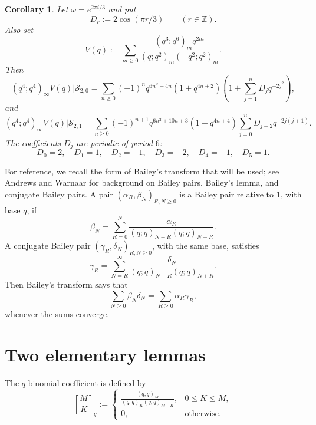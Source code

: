 \documentclass[11pt]{amsart}
\newtheorem{corollary}[theorem]{Corollary}
\theoremstyle{remark}
\newcommand{\Z}{\mathbb Z}
\newcommand{\qbinom}[3][]{\genfrac{[}{]}{0pt}{}{#2}{#3}_{#1}}
\newcommand{\sieve}[2]{\mathcal S_{#1,#2}}
\begin{document}
\begin{corollary}\label{cor:omega}
Let $\omega=e^{2\pi i/3}$ and put
\[
D_r:=2\cos(\pi r/3)\qquad(r\in\Z).
\]
Also set
\[
V(q):=\sum_{m\ge0}
\frac{(q^3;q^6)_m q^{2m}}
{(q;q^2)_m(-q^2;q^2)_m}.
\]
Then
\begin{equation}\label{omega-even}
(q^4;q^4)_\infty V(q)\big|\sieve{2}{0}
=
\sum_{n\ge0}(-1)^nq^{6n^2+4n}(1+q^{4n+2})
\left(1+\sum_{j=1}^{n}D_jq^{-2j^2}\right),
\end{equation}
and
\begin{equation}\label{omega-odd}
(q^4;q^4)_\infty V(q)\big|\sieve{2}{1}
=
\sum_{n\ge0}(-1)^{n+1}q^{6n^2+10n+3}(1+q^{4n+4})
\sum_{j=0}^{n}D_{j+2}q^{-2j(j+1)}.
\end{equation}
The coefficients $D_j$ are periodic of period $6$:
\[
D_0=2,\quad D_1=1,\quad D_2=-1,\quad D_3=-2,\quad
D_4=-1,\quad D_5=1.
\]
\end{corollary}

For reference, we recall the form of Bailey's transform that will be used; see Andrews \cite[Chapter 3]{AndrewsQSeries} and Warnaar \cite{WarnaarBailey} for background on Bailey pairs, Bailey's lemma, and conjugate Bailey pairs.  A pair $(\alpha_R,\beta_N)_{R,N\ge0}$ is a Bailey pair relative to $1$, with base $q$, if
\begin{equation}\label{bailey-pair-def}
\beta_N=
\sum_{R=0}^{N}\frac{\alpha_R}{(q;q)_{N-R}(q;q)_{N+R}}.
\end{equation}
A conjugate Bailey pair $(\gamma_R,\delta_N)_{R,N\ge0}$, with the same base, satisfies
\begin{equation}\label{conjugate-bailey-def}
\gamma_R=
\sum_{N=R}^{\infty}\frac{\delta_N}{(q;q)_{N-R}(q;q)_{N+R}}.
\end{equation}
Then Bailey's transform says that
\begin{equation}\label{bailey-transform}
\sum_{N\ge0}\beta_N\delta_N=\sum_{R\ge0}\alpha_R\gamma_R,
\end{equation}
whenever the sums converge.

\section{Two elementary lemmas}

The $q$-binomial coefficient is defined by~\cite[Definition 1]{AndrewsTheory}
\[
\qbinom[q]{M}{K}:=
\begin{cases}
\displaystyle \frac{(q;q)_M}{(q;q)_K(q;q)_{M-K}},&0\le K\le M,\\[6pt]
0,&\text{otherwise}.
\end{cases}
\]
\end{document}
